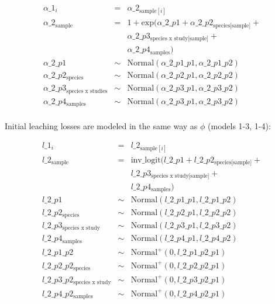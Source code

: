 \documentclass[
  12pt,
]{article}
\begin{document}
\begin{equation}
\begin{aligned}
\alpha\_1_i & = & \alpha\_2_{\text{sample}[i]}\\
\alpha\_2_{\text{sample}} & = & 1 + \text{exp}(\alpha\_2\_p1 + \alpha\_2\_p2_{\text{species[sample]}} + \\
                         && \alpha\_2\_p3_{\text{species x study[sample]}} + \\
                         && \alpha\_2\_p4_{\text{samples}})\\
\alpha\_2\_p1 & \sim & \text{Normal}(\alpha\_2\_p1\_p1, \alpha\_2\_p1\_p2)\\
\alpha\_2\_p2_{\text{species}} & \sim & \text{Normal}(\alpha\_2\_p2\_p1, \alpha\_2\_p2\_p2)\\
\alpha\_2\_p3_{\text{species x studies}} & \sim & \text{Normal}(\alpha\_2\_p3\_p1, \alpha\_2\_p3\_p2)\\
\alpha\_2\_p4_{\text{samples}} & \sim & \text{Normal}(\alpha\_2\_p3\_p1, \alpha\_2\_p3\_p2)\\
\label{eq:sup-model-6}
\end{aligned}
\end{equation}

Initial leaching losses are modeled in the same way as \(\phi\) (models 1-3, 1-4):

\begin{equation}
\begin{aligned}
l\_1_i & = & l\_2_{\text{sample}[i]}\\
l\_2_{\text{sample}} & = & \text{inv\_logit}(l\_2\_p1 + l\_2\_p2_{\text{species[sample]}} + \\
                        && l\_2\_p3_{\text{species x study[sample]}} + \\                              && l\_2\_p4_{\text{samples}})\\
l\_2\_p1 & \sim & \text{Normal}(l\_2\_p1\_p1, l\_2\_p1\_p2)\\
l\_2\_p2_{\text{species}} & \sim & \text{Normal}(l\_2\_p2\_p1, l\_2\_p2\_p2)\\
l\_2\_p3_{\text{species x study}} & \sim & \text{Normal}(l\_2\_p3\_p1, l\_2\_p3\_p2)\\
l\_2\_p4_{\text{samples}} & \sim & \text{Normal}(l\_2\_p4\_p1, l\_2\_p4\_p2)\\
l\_2\_p1\_p2 & \sim & \text{Normal}^+(0, l\_2\_p1\_p2\_p1)\\
l\_2\_p2\_p2_{\text{species}} & \sim & \text{Normal}^+(0, l\_2\_p2\_p2\_p1)\\
l\_2\_p3\_p2_{\text{species x study}} & \sim & \text{Normal}^+(0, l\_2\_p3\_p2\_p1)\\
l\_2\_p4\_p2_{\text{samples}} & \sim & \text{Normal}^+(0, l\_2\_p4\_p2\_p1)\\
\label{eq:sup-model-7}
\end{aligned}
\end{equation}
\end{document}
